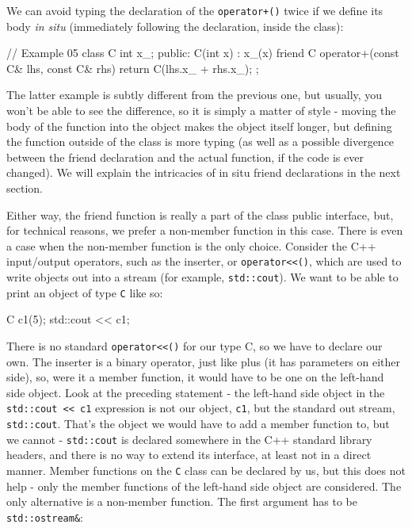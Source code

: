 We can avoid typing the declaration of the \texttt{operator+()} twice if we define its body \emph{in situ} (immediately following the declaration, inside the class):

\begin{code}
// Example 05
class C {
  int x_;
  public:
  C(int x) : x_(x) {}
  friend C operator+(const C& lhs, const C& rhs) {
    return C(lhs.x_ + rhs.x_);
  }
};
\end{code}

The latter example is subtly different from the previous one, but usually, you won't be able to see the difference, so it is simply a matter of style - moving the body of the function into the object makes the object itself longer, but defining the function outside of the class is more typing (as well as a possible divergence between the friend declaration and the actual function, if the code is ever changed). We will explain the intricacies of in situ friend declarations in the next section.

Either way, the friend function is really a part of the class public interface, but, for technical reasons, we prefer a non-member function in this case. There is even a case when the non-member function is the only choice. Consider the C++ input/output operators, such as the inserter, or \texttt{operator\textless{}\textless{}()}, which are used to write objects out into a stream (for example, \texttt{std::cout}). We want to be able to print an object of type \texttt{C} like so:

\begin{code}
C c1(5);
std::cout << c1;
\end{code}

There is no standard \texttt{operator\textless{}\textless{}()} for our type C, so we have to declare our own. The inserter is a binary operator, just like plus (it has parameters on either side), so, were it a member function, it would have to be one on the left-hand side object. Look at the preceding statement - the left-hand side object in the \texttt{std::cout\ \textless{}\textless{}\ c1} expression is not our object, \texttt{c1}, but the standard out stream, \texttt{std::cout}. That's the object we would have to add a member function to, but we cannot - \texttt{std::cout} is declared somewhere in the C++ standard library headers, and there is no way to extend its interface, at least not in a direct manner. Member functions on the \texttt{C} class can be declared by us, but this does not help - only the member functions of the left-hand side object are considered. The only alternative is a non-member function. The first argument has to be \texttt{std::ostream\&}:

